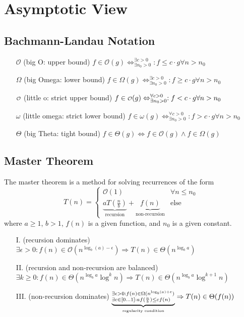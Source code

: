 \documentclass{article}
\newcommand{\bigO}{
  \mathcal{O}
}
\newcommand\littleO{
  \mathchoice
  {{\scriptstyle\mathcal{O}}}%
  {{\scriptstyle\mathcal{O}}}%
  {{\scriptscriptstyle\mathcal{O}}}%
  {\scalebox{.6}{$\scriptscriptstyle\mathcal{O}$}}%
}
\begin{document}
\section{Asymptotic View}
\subsection{Bachmann-Landau Notation}
\begin{itemize}
  \item[$\bigO$] (big O: upper bound) $f\in \bigO(g) \Leftrightarrow ^{\exists c > 0}_{\exists n_0 > 0}: f \leq c \cdot g \forall n > n_0$
  \item[$\Omega$] (big Omega: lower bound) $f\in \Omega(g) \Leftrightarrow ^{\exists c > 0}_{\exists n_0 > 0}: f \geq c \cdot g \forall n > n_0$
  \item[$\littleO$] (little o: strict upper bound) $f\in \littleO(g) \Leftrightarrow ^{\forall c > 0}_{\exists n_0 > 0}: f < c \cdot g \forall n > n_0$
  \item[$\omega$] (little omega: strict lower bound) $f\in \omega(g) \Leftrightarrow ^{\forall c > 0}_{\exists n_0 > 0}: f > c \cdot g \forall n > n_0$
  \item[$\Theta$] (big Theta: tight bound) $f\in \Theta(g) \Leftrightarrow f\in \bigO(g) \land f\in \Omega(g)$
\end{itemize}

\subsection{Master Theorem}
The master theorem is a method for solving recurrences of the form
\begin{equation}
  T(n) = \begin{cases}
    \bigO(1)                                                                                   & \forall n \leq n_0 \\
    \underbrace{aT(\frac{n}{b})}_{\text{recursion}} + \underbrace{f(n)}_{\text{non-recursion}} & \text{else}
  \end{cases}
\end{equation}
where $a \geq 1$, $b > 1$, $f(n)$ is a given function, and $n_0$ is a given constant.

\begin{itemize}
  \item[I.] (recursion dominates) $\exists \epsilon > 0: f(n) \in \bigO(n^{\log_b(a)-\epsilon}) \Rightarrow T(n) \in \Theta(n^{\log_b a})$
  \item[II.] (recursion and non-recursion are balanced) $\exists k \ge 0: f(n) \in \Theta(n^{\log_b a}\log^k n) \Rightarrow T(n) \in \Theta(n^{\log_b a} \log^{k+1} n)$
  \item[III.] (non-recursion dominates) $\underbrace{^{\exists \epsilon > 0: f(n) \in \Omega(n^{\log_b(a)+\epsilon})}_{\exists c \in [0\dots1]: a f(\frac{n}{b}) \leq c f(n)}}_{\text{\tiny regularity condition}} \Rightarrow T(n) \in \Theta(f(n))$
\end{itemize}
\end{document}
